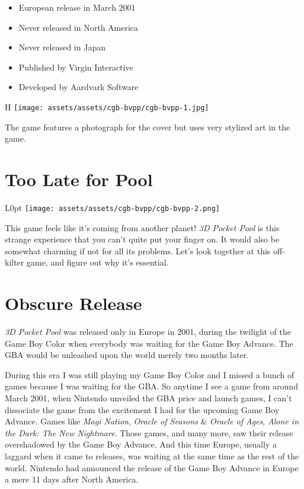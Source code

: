 \documentclass{book}
\begin{document}
\begin{itemize} \setlength\itemsep{-0.4em}
\item European release in March 2001
\item Never released in North America
\item Never released in Japan
\item Published by Virgin Interactive
\item Developed by Aardvark Software
\end{itemize}\noindent

\begin{wrapfigure}{H}{\linewidth}
\vskip 4pt
\centering \texttt{[image: assets/assets/cgb-bvpp/cgb-bvpp-1.jpg]}\par\pagetwodescription The game features a photograph for the cover but uses very stylized art in the game.\end{wrapfigure}
\clearpage

\FloatBarrier\needspace{10mm}\section*{Too Late for Pool}\nopagebreak[4]

\begin{wrapfigure}{L}{0pt} \texttt{[image: assets/assets/cgb-bvpp/cgb-bvpp-2.png]}\end{wrapfigure}
This game feels like it’s coming from another planet! \emph{3D Pocket Pool} is this strange experience that you can’t quite put your finger on. It would also be somewhat charming if not for all its problems. Let’s look together at this off-kilter game, and figure out why it’s essential.

\FloatBarrier\needspace{10mm}\section*{Obscure Release}\nopagebreak[4]

\emph{3D Pocket Pool} was released only in Europe in 2001, during the twilight of the Game Boy Color when everybody was waiting for the Game Boy Advance. The GBA would be unleashed upon the world merely two months later.

During this era I was still playing my Game Boy Color and I missed a bunch of games because I was waiting for the GBA. So anytime I see a game from around March 2001, when Nintendo unveiled the GBA price and launch games, I can’t dissociate the game from the excitement I had for the upcoming Game Boy Advance. Games like \emph{Magi Nation}, \emph{Oracle of Seasons} \& \emph{Oracle of Ages}, \emph{Alone in the Dark: The New Nightmare}. Those games, and many more, saw their release overshadowed by the Game Boy Advance. And this time Europe, usually a laggard when it came to releases, was waiting at the same time as the rest of the world. Nintendo had announced the release of the Game Boy Advance in Europe a mere 11 days after North America.
\end{document}

